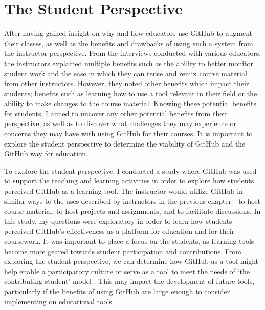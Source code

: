 








\chapter{The Student Perspective}

After having gained insight on why and how educators use GitHub to augment their classes, as well as the benefits and drawbacks of using such a system from the instructor perspective. From the interviews conducted with various educators, the instructors explained multiple benefits such as the ability to better monitor student work and the ease in which they can reuse and remix course material from other instructors. However, they noted other benefits which impact their students; benefits such as learning how to use a tool relevant in their field or the ability to make changes to the course material. Knowing these potential benefits for students, I aimed to uncover any other potential benefits from their perspective, as well as to discover what challenges they may experience or concerns they may have with using GitHub for their courses. It is important to explore the student perspective to determine the viability of GitHub and the GitHub way for education.

To explore the student perspective, I conducted a study where GitHub was used to support the teaching and learning activities in order to explore how students perceived GitHub as a learning tool. The instructor would utilize GitHub in similar ways to the uses described by instructors in the previous chapter---to host course material, to host projects and assignments, and to facilitate discussions. In this study, my questions were exploratory in order to learn how students perceived GitHub's effectiveness as a platform for education and for their coursework. It was important to place a focus on the students, as learning tools become more geared towards student participation and contributions. From exploring the student perspective, we can determine how GitHub as a tool might help enable a participatory culture \cite{jenkins2009confronting} or serve as a tool to meet the needs of `the contributing student' model \cite{hamer2008contributing}. This may impact the development of future tools, particularly if the benefits of using GitHub are large enough to consider implementing on educational tools.

